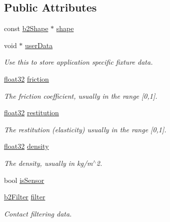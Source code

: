 \subsection*{Public Attributes}
\begin{DoxyCompactItemize}
\item 
const \mbox{\hyperlink{classb2_shape}{b2\+Shape}} $\ast$ \mbox{\hyperlink{structb2_fixture_def_a1e41753d89abf3443e7897e2498a3240}{shape}}
\item 
void $\ast$ \mbox{\hyperlink{structb2_fixture_def_a4f77ef2b2585a40899b61faf53db1093}{user\+Data}}
\begin{DoxyCompactList}\small\item\em Use this to store application specific fixture data. \end{DoxyCompactList}\item 
\mbox{\hyperlink{b2_settings_8h_aacdc525d6f7bddb3ae95d5c311bd06a1}{float32}} \mbox{\hyperlink{structb2_fixture_def_a66081c8d0e12d4bdb0b341fb97b46eb6}{friction}}
\begin{DoxyCompactList}\small\item\em The friction coefficient, usually in the range \mbox{[}0,1\mbox{]}. \end{DoxyCompactList}\item 
\mbox{\hyperlink{b2_settings_8h_aacdc525d6f7bddb3ae95d5c311bd06a1}{float32}} \mbox{\hyperlink{structb2_fixture_def_ad7ee26656e4749f7b548d2cc0cf9f168}{restitution}}
\begin{DoxyCompactList}\small\item\em The restitution (elasticity) usually in the range \mbox{[}0,1\mbox{]}. \end{DoxyCompactList}\item 
\mbox{\hyperlink{b2_settings_8h_aacdc525d6f7bddb3ae95d5c311bd06a1}{float32}} \mbox{\hyperlink{structb2_fixture_def_a6e27d733789a35aa689af2b30a1de0ff}{density}}
\begin{DoxyCompactList}\small\item\em The density, usually in kg/m$^\wedge$2. \end{DoxyCompactList}\item 
bool \mbox{\hyperlink{structb2_fixture_def_ac8cfcc6208663c92861eaab3b3fdc57e}{is\+Sensor}}
\item 
\mbox{\hyperlink{structb2_filter}{b2\+Filter}} \mbox{\hyperlink{structb2_fixture_def_a4c3e493a13d11ab27fcc2eee9f52fd61}{filter}}
\begin{DoxyCompactList}\small\item\em Contact filtering data. \end{DoxyCompactList}\end{DoxyCompactItemize}


